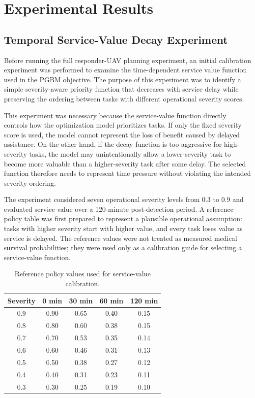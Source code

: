 \chapter{Experimental Results}
\label{chapter_experimentalResults}

\section{Temporal Service-Value Decay Experiment}
\label{sec:temporal_decay_experiment}

Before running the full responder-UAV planning experiment, an initial
calibration experiment was performed to examine the time-dependent service
value function used in the PGBM objective. The purpose of this experiment was
to identify a simple severity-aware priority function that decreases with
service delay while preserving the ordering between tasks with different
operational severity scores.

This experiment was necessary because the service-value function directly
controls how the optimization model prioritizes tasks. If only the fixed
severity score is used, the model cannot represent the loss of benefit caused
by delayed assistance. On the other hand, if the decay function is too
aggressive for high-severity tasks, the model may unintentionally allow a
lower-severity task to become more valuable than a higher-severity task after
some delay. The selected function therefore needs to represent time pressure
without violating the intended severity ordering.

The experiment considered seven operational severity levels from 0.3 to 0.9
and evaluated service value over a 120-minute post-detection period. A
reference policy table was first prepared to represent a plausible operational
assumption: tasks with higher severity start with higher value, and every task
loses value as service is delayed. The reference values were not treated as
measured medical survival probabilities; they were used only as a calibration
guide for selecting a service-value function.

\begin{table}[htbp]
\centering
\caption{Reference policy values used for service-value calibration.}
\label{tab:reference_policy_values}
\begin{tabular}{ccccc}
\hline
\textbf{Severity} & \textbf{0 min} & \textbf{30 min} & \textbf{60 min} & \textbf{120 min}\\
\hline
0.9 & 0.90 & 0.65 & 0.40 & 0.15\\
0.8 & 0.80 & 0.60 & 0.38 & 0.15\\
0.7 & 0.70 & 0.53 & 0.35 & 0.14\\
0.6 & 0.60 & 0.46 & 0.31 & 0.13\\
0.5 & 0.50 & 0.38 & 0.27 & 0.12\\
0.4 & 0.40 & 0.31 & 0.23 & 0.11\\
0.3 & 0.30 & 0.25 & 0.19 & 0.10\\
\hline
\end{tabular}
\end{table}

